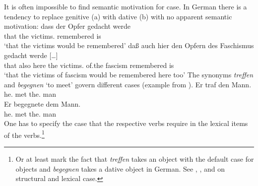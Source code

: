 \begin{exe}
\begin{xlist}[iv.]
\begin{exe}
\begin{xlist}[iv.]
It is often impossible to find semantic motivation for case.  In German there is a
tendency to replace genitive (a) with dative (b) with no apparent semantic motivation:  
\eal
\ex 
\gll dass der Opfer gedacht werde\\
     that the victims.\gen{} remembered is\\
\glt `that the victims would be remembered'
\ex 
\gll daß auch hier den Opfern des Faschismus gedacht werde [\ldots]\footnotemark\\
     that also here the victims.\dat{} of.the fascism remembered is\\
\glt `that the victims of fascism would be remembered here too'
\zl
The synonyms \emph{treffen} and \emph{begegnen} `to meet' govern different cases (example from \citet[]{ps}).
\eal
\ex 
\gll Er traf den Mann.\\
     he.\nom{} met the.\acc{} man\\
\ex 
\gll Er begegnete dem Mann.\\
     he.\nom{} met the.\dat{} man\\
\zl
One has to specify the case that the respective verbs require in the lexical items of the verbs.\footnote{%
  Or at least mark the fact that \emph{treffen} takes an object with the default case for
  objects and \emph{begegnen} takes a dative object in German. See , , and
   on structural and lexical case.
}
%


\end{xlist}
\end{exe}
\end{xlist}
\end{exe}
